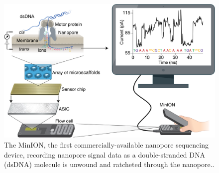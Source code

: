 \begin{figure}
\centering
\includegraphics[scale=0.2]{litreview/plots/nano.png}
\caption[\label{fig:nano}The MinION, the first commercially-available nanopore sequencing device, recording nanopore signal data as a double-stranded DNA (dsDNA) molecule is unwound and ratcheted through the nanopore.]{\label{fig:nano}The MinION, the first commercially-available nanopore sequencing device, recording nanopore signal data as a double-stranded DNA (dsDNA) molecule is unwound and ratcheted through the nanopore.\protect\footnotemark[3].}
\end{figure}
